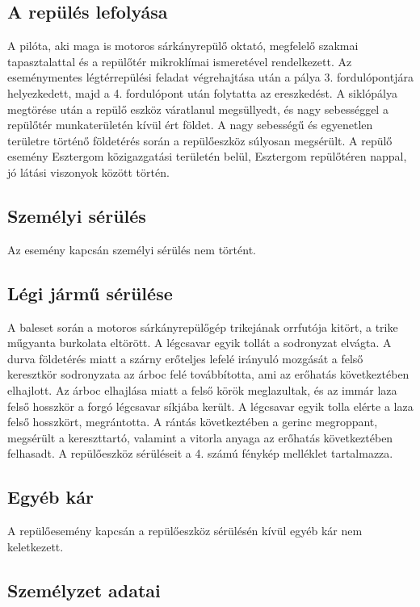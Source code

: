 \documentclass[a4paper,10pt]{article}
\begin{document}
\subsection{A repülés lefolyása}
A pilóta, aki maga is motoros sárkányrepülő oktató, megfelelő szakmai 
tapasztalattal és a repülőtér mikroklímai ismeretével rendelkezett. Az 
eseménymentes légtérrepülési feladat végrehajtása után a pálya 3. 
fordulópontjára helyezkedett, majd a 4. fordulópont után folytatta az 
ereszkedést. A siklópálya megtörése után a repülő eszköz váratlanul 
megsüllyedt, és nagy sebességgel a repülőtér munkaterületén kívül ért
földet. A nagy sebességű és egyenetlen területre történő földetérés során a 
repülőeszköz súlyosan megsérült. A repülő esemény Esztergom közigazgatási 
területén belül, Esztergom repülőtéren nappal, jó látási viszonyok között 
történ.

\subsection{Személyi sérülés}
Az esemény kapcsán személyi sérülés nem történt.

\subsection{Légi jármű sérülése}
A baleset során a motoros sárkányrepülőgép trikejának orrfutója kitört, a 
trike műgyanta burkolata eltörött. A légcsavar egyik tollát a sodronyzat 
elvágta. A durva földetérés miatt a szárny erőteljes lefelé irányuló
mozgását a felső keresztkör sodronyzata az árboc felé továbbította, ami az 
erőhatás következtében elhajlott.
Az árboc elhajlása miatt a felső körök meglazultak, és az 
immár laza felső hosszkör a forgó légcsavar síkjába került. A légcsavar
egyik tolla elérte a laza felső hosszkört, megrántotta. A rántás
következtében a gerinc megroppant, megsérült a kereszttartó, valamint a
vitorla anyaga az erőhatás következtében felhasadt.
A repülőeszköz sérüléseit a 4. számú fénykép melléklet tartalmazza.

\subsection{Egyéb kár}
A repülőesemény kapcsán a repülőeszköz sérülésén kívül egyéb kár nem 
keletkezett.

\subsection{Személyzet adatai}
\end{document}
